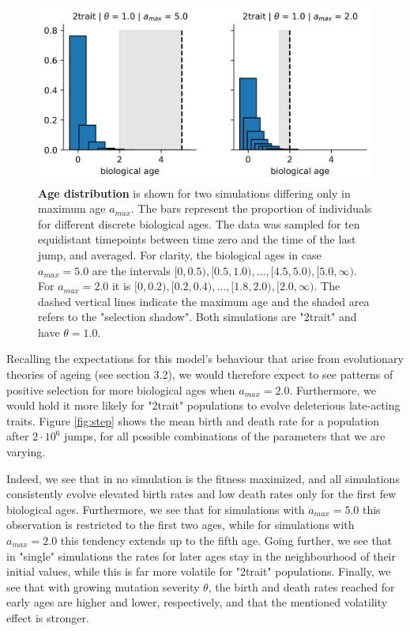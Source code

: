 \documentclass[11pt, a4paper]{article}
\theoremstyle{definition}
\begin{document}
    \begin{figure}[!htb]
        \center
        \includegraphics[scale=0.8]{figures/age_dist.png}
        \caption{\textbf{Age distribution} is shown for two simulations differing only in maximum age $a_{max}$. The bars represent the proportion of individuals for different discrete biological ages. The data was sampled for ten equidistant timepoints between time zero and the time of the last jump, and averaged. For clarity, the biological ages in case $a_{max}=5.0$ are the intervals $[0,0.5), [0.5,1.0), \ldots, [4.5, 5.0), [5.0, \infty)$. For $a_{max} = 2.0$ it is $[0,0.2), [0.2,0.4), \ldots, [1.8,
        2.0), [2.0, \infty)$. The dashed vertical lines indicate the maximum age and the shaded area refers to the "selection shadow". Both simulations are "2trait" and have $\theta=1.0$.}
        \label{fig:agedist}
    \end{figure}

    Recalling the expectations for this model's behaviour that arise from evolutionary theories of ageing (see section 3.2), we would therefore expect to see patterns of positive selection for more biological ages when $a_{max}=2.0$. Furthermore, we would hold it more likely for "2trait" populations to evolve deleterious late-acting traits. Figure \ref{fig:step} shows the mean birth and death rate for a population after $2\cdot 10^6$ jumps, for all possible combinations of the parameters that we are varying.

    Indeed, we see that in no simulation is the fitness maximized, and all simulations consistently evolve elevated birth rates and low death rates only for the first few biological ages. Furthermore, we see that for simulations with $a_{max}=5.0$ this observation is restricted to the first two ages, while for simulations with $a_{max}=2.0$ this tendency extends up to the fifth age.
    Going further, we see that in "single" simulations the rates for later ages stay in the neighbourhood of their initial values, while this is far more volatile for "2trait" populations. Finally, we see that with growing mutation severity $\theta$, the birth and death rates reached for early ages are higher and lower, respectively, and that the mentioned volatility effect is stronger.
\end{document}
